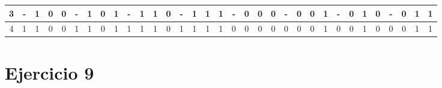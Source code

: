 \begin{table}[ht]
\begin{tabular}{|c|cccc|cccc|cccc|cccc|cccc|cccc|cccc|cccc|}
  3 & \multicolumn{1}{c|}{\cellcolor[HTML]{C0C0C0}-} & \multicolumn{1}{c|}{\cellcolor[HTML]{EFEFEF}1} & \multicolumn{1}{c|}{0} & 0 & \multicolumn{1}{c|}{\cellcolor[HTML]{C0C0C0}-} & \multicolumn{1}{c|}{\cellcolor[HTML]{EFEFEF}1} & \multicolumn{1}{c|}{0} & 1 & \multicolumn{1}{c|}{\cellcolor[HTML]{C0C0C0}-} & \multicolumn{1}{c|}{\cellcolor[HTML]{EFEFEF}1} & \multicolumn{1}{c|}{\cellcolor[HTML]{EFEFEF}1} & 0 & \multicolumn{1}{c|}{\cellcolor[HTML]{C0C0C0}-} & \multicolumn{1}{c|}{\cellcolor[HTML]{EFEFEF}1} & \multicolumn{1}{c|}{\cellcolor[HTML]{EFEFEF}1} & 1 & \multicolumn{1}{c|}{\cellcolor[HTML]{C0C0C0}-} & \multicolumn{1}{c|}{\cellcolor[HTML]{EFEFEF}0} & \multicolumn{1}{c|}{\cellcolor[HTML]{EFEFEF}0} & 0 & \multicolumn{1}{c|}{\cellcolor[HTML]{C0C0C0}-} & \multicolumn{1}{c|}{\cellcolor[HTML]{EFEFEF}0} & \multicolumn{1}{c|}{\cellcolor[HTML]{EFEFEF}0} & 1 & \multicolumn{1}{c|}{\cellcolor[HTML]{C0C0C0}-} & \multicolumn{1}{c|}{\cellcolor[HTML]{EFEFEF}0} & \multicolumn{1}{c|}{1} & 0 & \multicolumn{1}{c|}{\cellcolor[HTML]{C0C0C0}-} & \multicolumn{1}{c|}{\cellcolor[HTML]{EFEFEF}0} & \multicolumn{1}{c|}{1} & 1 \\ \hline
  4 & \multicolumn{1}{c|}{\cellcolor[HTML]{EFEFEF}1} & \multicolumn{1}{c|}{\cellcolor[HTML]{EFEFEF}1} & \multicolumn{1}{c|}{0} & 0 & \multicolumn{1}{c|}{\cellcolor[HTML]{EFEFEF}1} & \multicolumn{1}{c|}{\cellcolor[HTML]{EFEFEF}1} & \multicolumn{1}{c|}{0} & 1 & \multicolumn{1}{c|}{\cellcolor[HTML]{EFEFEF}1} & \multicolumn{1}{c|}{\cellcolor[HTML]{EFEFEF}1} & \multicolumn{1}{c|}{\cellcolor[HTML]{EFEFEF}1} & 0 & \multicolumn{1}{c|}{\cellcolor[HTML]{EFEFEF}1} & \multicolumn{1}{c|}{\cellcolor[HTML]{EFEFEF}1} & \multicolumn{1}{c|}{\cellcolor[HTML]{EFEFEF}1} & 1 & \multicolumn{1}{c|}{\cellcolor[HTML]{EFEFEF}0} & \multicolumn{1}{c|}{\cellcolor[HTML]{EFEFEF}0} & \multicolumn{1}{c|}{\cellcolor[HTML]{EFEFEF}0} & 0 & \multicolumn{1}{c|}{\cellcolor[HTML]{EFEFEF}0} & \multicolumn{1}{c|}{\cellcolor[HTML]{EFEFEF}0} & \multicolumn{1}{c|}{\cellcolor[HTML]{EFEFEF}0} & 1 & \multicolumn{1}{c|}{\cellcolor[HTML]{EFEFEF}0} & \multicolumn{1}{c|}{\cellcolor[HTML]{EFEFEF}0} & \multicolumn{1}{c|}{1} & 0 & \multicolumn{1}{c|}{\cellcolor[HTML]{EFEFEF}0} & \multicolumn{1}{c|}{\cellcolor[HTML]{EFEFEF}0} & \multicolumn{1}{c|}{1} & 1 \\ \hline
  \end{tabular}
\end{table}

\section{Ejercicio 9}

